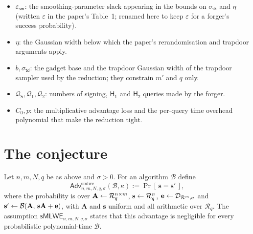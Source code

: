 \documentclass{aicr-conjecture}
\newcommand{\cR}{\mathcal{R}}
\newcommand{\cD}{\mathcal{D}}
\newcommand{\cB}{\mathcal{B}}
\newcommand{\cQ}{\mathcal{Q}}
\newcommand{\Adv}{\mathsf{Adv}}
\newcommand{\smlwe}{\mathsf{sMLWE}}
\newcommand{\ssk}{\sigma_{\mathsf{sk}}}
\newcommand{\std}{\sigma_{\mathsf{td}}}
\newcommand{\esm}{\varepsilon_{\mathsf{sm}}}
\newcommand{\Hone}{\mathsf{H}_1}
\newcommand{\Htwo}{\mathsf{H}_2}
\begin{document}
\begin{itemize}[leftmargin=1.2em]
  signing gives up.
  \item $\esm$: the smoothing-parameter slack appearing in the bounds
  on $\ssk$ and $\eta$ (written $\varepsilon$ in the paper's Table~1;
  renamed here to keep $\varepsilon$ for a forger's success
  probability).
  \item $\eta$: the Gaussian width below which the paper's
  rerandomisation and trapdoor arguments apply.
  \item $b, \std$: the gadget base and the trapdoor Gaussian width of
  the trapdoor sampler used by the reduction; they constrain $m'$ and
  $q$ only.
  \item $\cQ_{\mathsf{S}}, \cQ_1, \cQ_2$: numbers of signing, $\Hone$
  and $\Htwo$ queries made by the forger.
  \item $C_0, p$: the multiplicative advantage loss and the per-query
  time overhead polynomial that make the reduction tight.
\end{itemize}

\section{The conjecture}\label{sec:conjectures}

\begin{definition}
\label{def:smlwe}
Let $n,m,N,q$ be as above and $\sigma > 0$. For an algorithm $\cB$
define
\[
  \Adv^{\mathrm{smlwe}}_{n,m,N,q,\sigma}(\cB,\kappa)
    := \Pr[\, \mathbf{s} = \mathbf{s}' \,],
\]
where the probability is over
$\mathbf{A} \sample \cR_q^{n\times m}$,
$\mathbf{s} \sample \cR_q^{n}$,
$\mathbf{e} \sample \cD_{\cR^m,\sigma}$ and
$\mathbf{s}' \sample \cB(\mathbf{A},\, \mathbf{s}\mathbf{A}+\mathbf{e})$,
with $\mathbf{A}$ and $\mathbf{s}$ uniform and all arithmetic over
$\cR_q$. The assumption $\smlwe_{n,m,N,q,\sigma}$ states that this
advantage is negligible for every probabilistic polynomial-time $\cB$.
\end{definition}
\end{document}
